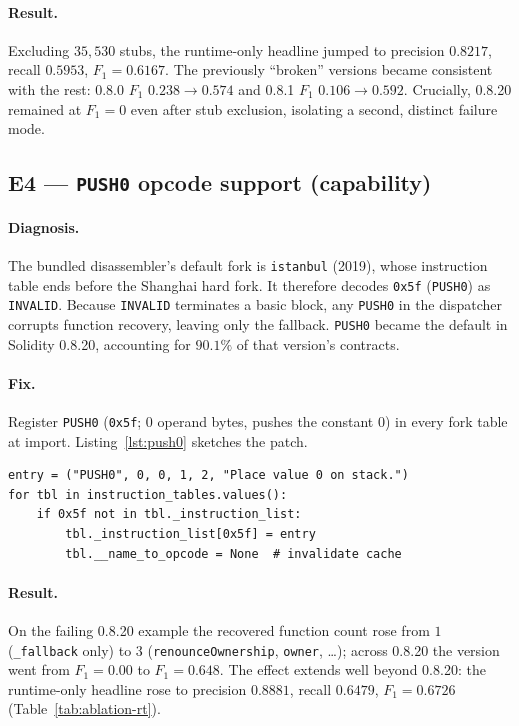 \documentclass[10pt,conference]{article}
\newcommand{\fbyte}[1]{\texttt{0x#1}}
\begin{document}
\paragraph{Result.}
Excluding $35{,}530$ stubs, the runtime-only headline jumped to precision
$0.8217$, recall $0.5953$, $F_1=0.6167$. The previously ``broken'' versions
became consistent with the rest: 0.8.0 $F_1$ $0.238\rightarrow0.574$ and 0.8.1
$F_1$ $0.106\rightarrow0.592$. Crucially, 0.8.20 remained at $F_1=0$ even after
stub exclusion, isolating a second, distinct failure mode.

\subsection{E4 --- \texttt{PUSH0} opcode support (capability)}
\label{sec:e4}

\paragraph{Diagnosis.}
The bundled disassembler's default fork is \texttt{istanbul} (2019), whose
instruction table ends before the Shanghai hard fork. It therefore decodes
\fbyte{5f} (\texttt{PUSH0}) as \texttt{INVALID}. Because \texttt{INVALID}
terminates a basic block, any \texttt{PUSH0} in the dispatcher corrupts function
recovery, leaving only the fallback. \texttt{PUSH0} became the default in
Solidity 0.8.20, accounting for $90.1\%$ of that version's contracts.

\paragraph{Fix.}
Register \texttt{PUSH0} (\fbyte{5f}; 0 operand bytes, pushes the constant $0$) in
every fork table at import. Listing~\ref{lst:push0} sketches the patch.

\begin{lstlisting}[style=evm,caption={\texttt{PUSH0} registration patch (excerpt).},label={lst:push0}]
entry = ("PUSH0", 0, 0, 1, 2, "Place value 0 on stack.")
for tbl in instruction_tables.values():
    if 0x5f not in tbl._instruction_list:
        tbl._instruction_list[0x5f] = entry
        tbl.__name_to_opcode = None  # invalidate cache
\end{lstlisting}

\paragraph{Result.}
On the failing 0.8.20 example the recovered function count rose from $1$
(\texttt{\_fallback} only) to $3$ (\texttt{renounceOwnership}, \texttt{owner},
\dots); across 0.8.20 the version went from $F_1=0.00$ to $F_1=0.648$. The effect
extends well beyond 0.8.20: the runtime-only headline rose to precision
$0.8881$, recall $0.6479$, $F_1=0.6726$ (Table~\ref{tab:ablation-rt}).
\end{document}
